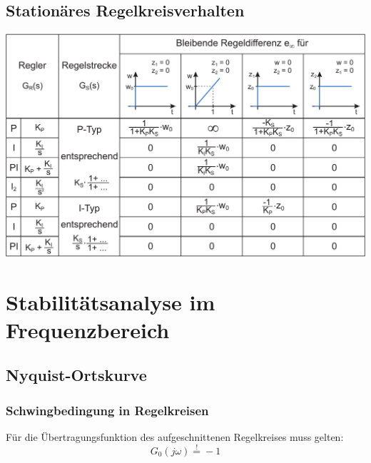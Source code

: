 \documentclass[a4paper,twocolumn,10pt]{article}
\newcommand{\sollsein}{\stackrel{!}{=}}
\begin{document}
\subsection{Stationäres Regelkreisverhalten}
\includegraphics[width=0.98\columnwidth]{Grafiken/Stat_Regelkreisverhalten}

\section{Stabilitätsanalyse im Frequenzbereich}

\subsection{Nyquist-Ortskurve}

\subsubsection{Schwingbedingung in Regelkreisen}
Für die Übertragungsfunktion des aufgeschnittenen Regelkreises muss gelten:
\begin{equation*}
G_0(j\omega)\sollsein -1
\end{equation*}
\end{document}
